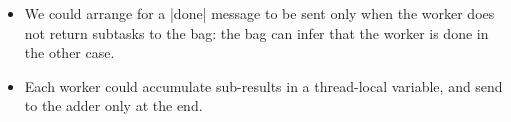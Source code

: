 \begin{answer}
\begin{itemize}
\item
We could arrange for a |done| message to be sent only when the worker
does not return subtasks to the bag: the bag can infer that the worker
is done in the other case.

\item 
Each worker could accumulate sub-results in a thread-local variable, and send
to the adder only at the end. 

\end{itemize}
\end{answer}

